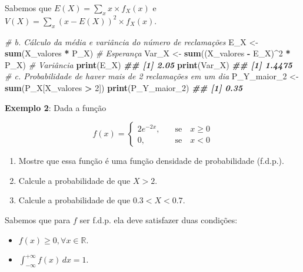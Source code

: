 \documentclass[
]{book}
\newenvironment{Shaded}{\begin{snugshade}}{\end{snugshade}}
\newcommand{\CommentTok}[1]{\textcolor[rgb]{0.56,0.35,0.01}{\textit{#1}}}
\newcommand{\DecValTok}[1]{\textcolor[rgb]{0.00,0.00,0.81}{#1}}
\newcommand{\DocumentationTok}[1]{\textcolor[rgb]{0.56,0.35,0.01}{\textbf{\textit{#1}}}}
\newcommand{\FunctionTok}[1]{\textcolor[rgb]{0.13,0.29,0.53}{\textbf{#1}}}
\newcommand{\NormalTok}[1]{#1}
\newcommand{\OtherTok}[1]{\textcolor[rgb]{0.56,0.35,0.01}{#1}}
\newcommand{\SpecialCharTok}[1]{\textcolor[rgb]{0.81,0.36,0.00}{\textbf{#1}}}
\providecommand{\tightlist}{%
  \setlength{\itemsep}{0pt}\setlength{\parskip}{0pt}}
\begin{document}
Sabemos que \(E(X)=\sum_{x}x\times f_{X}(x)\) e \(V(X) = \sum_{x}(x-E(X))^2\times f_{X}(x)\).

\begin{Shaded}
\begin{Highlighting}[]
\CommentTok{\# b. Cálculo da média e variância do número de reclamações}
\NormalTok{E\_X }\OtherTok{\textless{}{-}} \FunctionTok{sum}\NormalTok{(X\_valores }\SpecialCharTok{*}\NormalTok{ P\_X)  }\CommentTok{\# Esperança}
\NormalTok{Var\_X }\OtherTok{\textless{}{-}} \FunctionTok{sum}\NormalTok{((X\_valores }\SpecialCharTok{{-}}\NormalTok{ E\_X)}\SpecialCharTok{\^{}}\DecValTok{2} \SpecialCharTok{*}\NormalTok{ P\_X)  }\CommentTok{\# Variância}
\FunctionTok{print}\NormalTok{(E\_X)  }
\DocumentationTok{\#\# [1] 2.05}
\FunctionTok{print}\NormalTok{(Var\_X)}
\DocumentationTok{\#\# [1] 1.4475}
\CommentTok{\# c. Probabilidade de haver mais de 2 reclamações em um dia}
\NormalTok{P\_Y\_maior\_2 }\OtherTok{\textless{}{-}} \FunctionTok{sum}\NormalTok{(P\_X[X\_valores }\SpecialCharTok{\textgreater{}} \DecValTok{2}\NormalTok{])}
\FunctionTok{print}\NormalTok{(P\_Y\_maior\_2)}
\DocumentationTok{\#\# [1] 0.35}
\end{Highlighting}
\end{Shaded}

\textbf{Exemplo 2}: Dada a função

\[f(x) = \begin{cases}
2e^{-2x},& \quad \text{se} \quad x\geq 0 \\
0,& \quad \text{se} \quad x<0
\end{cases}\]

\begin{enumerate}
\def\labelenumi{\alph{enumi})}
\tightlist
\item
  Mostre que essa função é uma função densidade de probabilidade (f.d.p.).
\item
  Calcule a probabilidade de que \(X>2\).
\item
  Calcule a probabilidade de que \(0.3 < X < 0.7\).
\end{enumerate}

Sabemos que para \(f\) ser f.d.p. ela deve satisfazer duas condições:

\begin{itemize}
\tightlist
\item
  \(f(x)\geq 0, \forall x \in \mathbb{R}\).
\item
  \(\int_{-\infty}^{+\infty}f(x)\, dx = 1\).
\end{itemize}
\end{document}

